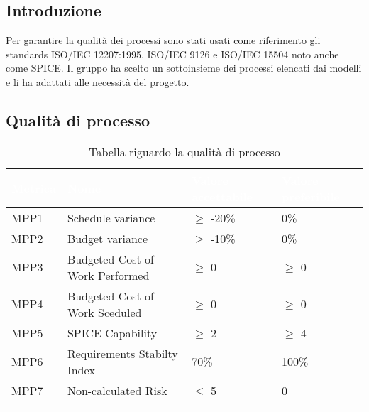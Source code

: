 \subsection{Introduzione}
Per garantire la qualità dei processi sono stati usati come riferimento gli standards 
ISO/IEC 12207:1995, ISO/IEC 9126 e ISO/IEC 15504 noto anche come SPICE.
Il gruppo ha scelto un sottoinsieme dei processi elencati dai modelli e li ha adattati alle 
necessità del progetto.

\subsection{Qualità di processo}
{

    \setlength{\freewidth}{\dimexpr\textwidth-10\tabcolsep}
    \renewcommand{\arraystretch}{1.5}
    \centering
    \setlength{\aboverulesep}{0pt}
    \setlength{\belowrulesep}{0pt}
    \begin{longtable}{C{.257\freewidth} C{.257\freewidth} C{.257\freewidth} C{.257\freewidth}}
       \toprule
    \textcolor{white}{\textbf{Metrica}}&
    \textcolor{white}{\textbf{Nome}}&
    \textcolor{white}{\textbf{Valore accettabile}}&
    \textcolor{white}{\textbf{Valore preferibile}}\\	
    \toprule
    \endhead
    
    
    MPP1 & Schedule variance & $\geq$ -20\% & 0\% \\
    MPP2 & Budget variance & $\geq$ -10\% & 0\% \\
    MPP3 & Budgeted Cost of Work Performed & $\geq$ 0 & $\geq$ 0 \\
    MPP4 & Budgeted Cost of Work Sceduled & $\geq$ 0 & $\geq$ 0 \\
    MPP5 & SPICE Capability & $\geq$ 2 & $\geq$ 4 \\
    MPP6 & Requirements Stabilty Index & 70\% & 100\% \\
    MPP7 & Non-calculated Risk & $\leq$ 5 & 0 \\	   
    \bottomrule
    \caption{Tabella riguardo la qualità di processo}
    \end{longtable}
}

